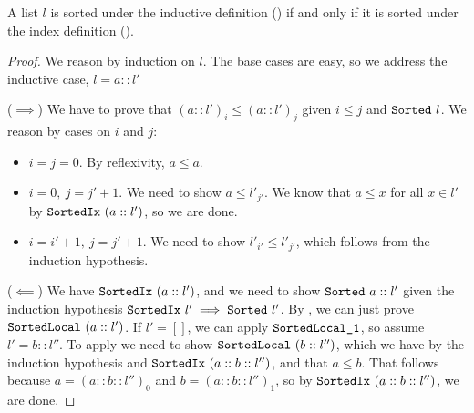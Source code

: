 \documentclass[11pt]{thesis}
\begin{document}
\begin{theorem}
  A list $l$ is sorted under the inductive definition () if
  and only if it is sorted under the index definition ().
\end{theorem}
\begin{proof}
  We reason by induction on $l$. The base cases are easy, so we
  address the inductive case, $l = a :: l'$

  ($\implies$) We have to prove that $(a :: l')_i \le (a :: l')_j$ given
  $i \le j$ and $\texttt{Sorted}~l$. We reason by cases on $i$ and $j$:
  \begin{itemize}[noitemsep]
  \item $i = j = 0$. By reflexivity, $a \le a$.
  \item $i = 0,~j=j' + 1$. We need to show $a \le l'_{j'}$. We know that
    $a \le x$ for all $x \in l'$ by $\texttt{SortedIx}~(a::l')$, so we are
    done.
  \item $i = i' +1,~j = j' + 1$. We need to show $l'_{i'} \le l'_{j'}$,
    which follows from the induction hypothesis.
  \end{itemize}

  ($\impliedby$) We have $\texttt{SortedIx}~(a :: l')$, and we need to
  show $\texttt{Sorted}~a :: l'$ given the induction hypothesis
  $\texttt{SortedIx}~l' \implies \texttt{Sorted}~l'$. By
  , we can just prove $\texttt{SortedLocal}~(a ::
  l')$. If $l' = []$, we can apply $\texttt{SortedLocal\_1}$, so assume
  $l' = b :: l''$. To apply  we need to show
  $\texttt{SortedLocal}~(b :: l'')$, which we have by the induction
  hypothesis and $\texttt{SortedIx}~(a :: b :: l'')$, and that $a \le b$.
  That follows because $a = (a :: b :: l'')_0$ and $b = (a :: b ::
  l'')_1$, so by $\texttt{SortedIx}~(a :: b :: l'')$, we are done.
\end{proof}

\subsection{}
\label{subsec:perm}
\end{document}
